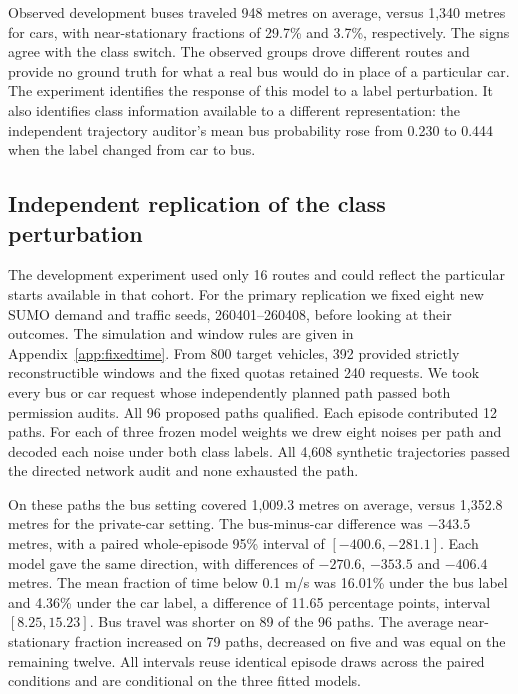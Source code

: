 Observed development buses traveled 948 metres on average, versus 1,340 metres for cars, with near-stationary fractions of 29.7\% and 3.7\%, respectively. The signs agree with the class switch. The observed groups drove different routes and provide no ground truth for what a real bus would do in place of a particular car. The experiment identifies the response of this model to a label perturbation. It also identifies class information available to a different representation: the independent trajectory auditor's mean bus probability rose from 0.230 to 0.444 when the label changed from car to bus.

\subsection{Independent replication of the class perturbation}
The development experiment used only 16 routes and could reflect the particular starts available in that cohort. For the primary replication we fixed eight new SUMO demand and traffic seeds, 260401--260408, before looking at their outcomes. The simulation and window rules are given in Appendix~\ref{app:fixedtime}. From 800 target vehicles, 392 provided strictly reconstructible windows and the fixed quotas retained 240 requests. We took every bus or car request whose independently planned path passed both permission audits. All 96 proposed paths qualified. Each episode contributed 12 paths. For each of three frozen model weights we drew eight noises per path and decoded each noise under both class labels. All 4,608 synthetic trajectories passed the directed network audit and none exhausted the path.

On these paths the bus setting covered 1,009.3 metres on average, versus 1,352.8 metres for the private-car setting. The bus-minus-car difference was $-343.5$ metres, with a paired whole-episode 95\% interval of $[-400.6,-281.1]$. Each model gave the same direction, with differences of $-270.6$, $-353.5$ and $-406.4$ metres. The mean fraction of time below 0.1 m/s was 16.01\% under the bus label and 4.36\% under the car label, a difference of 11.65 percentage points, interval $[8.25,15.23]$. Bus travel was shorter on 89 of the 96 paths. The average near-stationary fraction increased on 79 paths, decreased on five and was equal on the remaining twelve. All intervals reuse identical episode draws across the paired conditions and are conditional on the three fitted models.


